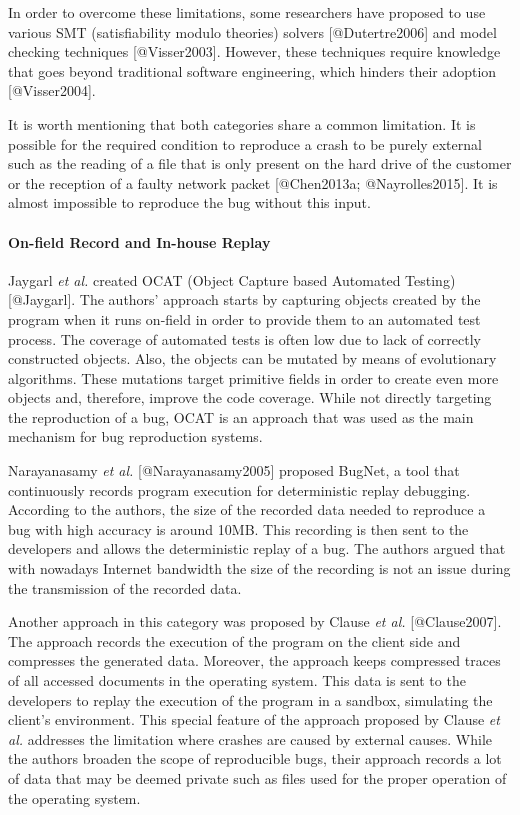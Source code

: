 In order to overcome these limitations, some researchers have proposed
to use various SMT (satisfiability modulo theories) solvers
{[}@Dutertre2006{]} and model checking techniques {[}@Visser2003{]}.
However, these techniques require knowledge that goes beyond traditional
software engineering, which hinders their adoption {[}@Visser2004{]}.

It is worth mentioning that both categories share a common limitation.
It is possible for the required condition to reproduce a crash to be
purely external such as the reading of a file that is only present on
the hard drive of the customer or the reception of a faulty network
packet {[}@Chen2013a; @Nayrolles2015{]}. It is almost impossible to
reproduce the bug without this input.

\paragraph{On-field Record and In-house
Replay}\label{on-field-record-and-in-house-replay}

Jaygarl {\emph{et al.}} created OCAT (Object Capture based Automated
Testing) {[}@Jaygarl{]}. The authors' approach starts by capturing
objects created by the program when it runs on-field in order to provide
them to an automated test process. The coverage of automated tests is
often low due to lack of correctly constructed objects. Also, the
objects can be mutated by means of evolutionary algorithms. These
mutations target primitive fields in order to create even more objects
and, therefore, improve the code coverage. While not directly targeting
the reproduction of a bug, OCAT is an approach that was used as the main
mechanism for bug reproduction systems.

Narayanasamy {\emph{et al.}} {[}@Narayanasamy2005{]} proposed BugNet, a
tool that continuously records program execution for deterministic
replay debugging. According to the authors, the size of the recorded
data needed to reproduce a bug with high accuracy is around 10MB. This
recording is then sent to the developers and allows the deterministic
replay of a bug. The authors argued that with nowadays Internet
bandwidth the size of the recording is not an issue during the
transmission of the recorded data.

Another approach in this category was proposed by Clause {\emph{et al.}}
{[}@Clause2007{]}. The approach records the execution of the program on
the client side and compresses the generated data. Moreover, the
approach keeps compressed traces of all accessed documents in the
operating system. This data is sent to the developers to replay the
execution of the program in a sandbox, simulating the client's
environment. This special feature of the approach proposed by Clause
{\emph{et al.}} addresses the limitation where crashes are caused by
external causes. While the authors broaden the scope of reproducible
bugs, their approach records a lot of data that may be deemed private
such as files used for the proper operation of the operating system.

